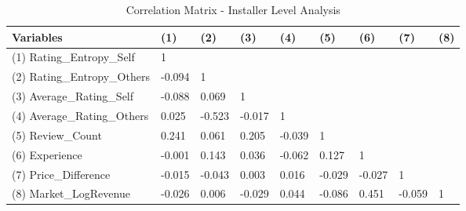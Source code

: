 \begin{table}[H]
\centering
\begin{tabular}{@{}lllllllll@{}}
\toprule
Variables                   & (1)    & (2)    & (3)    & (4)    & (5)    & (6)    & (7)        & (8)     \\ \midrule
(1) Rating\_Entropy\_Self   & 1      & \multicolumn{7}{l}{}                                              \\
(2) Rating\_Entropy\_Others & -0.094 & 1      & \multicolumn{6}{l}{}                                     \\
(3) Average\_Rating\_Self   & -0.088 & 0.069  & 1      & \multicolumn{5}{l}{}                            \\
(4) Average\_Rating\_Others & 0.025  & -0.523 & -0.017 & 1      & \multicolumn{4}{l}{}                   \\
(5) Review\_Count           & 0.241  & 0.061  & 0.205  & -0.039 & 1      & \multicolumn{3}{l}{}          \\
(6) Experience              & -0.001 & 0.143  & 0.036  & -0.062 & 0.127  & 1      & \multicolumn{2}{l}{} \\
(7) Price\_Difference       & -0.015 & -0.043 & 0.003  & 0.016  & -0.029 & -0.027 & 1          &         \\
(8) Market\_LogRevenue      & -0.026 & 0.006  & -0.029 & 0.044  & -0.086 & 0.451  & -0.059     & 1       \\ \bottomrule
\end{tabular}%
\caption{Correlation Matrix - Installer Level Analysis}
\label{corr_ind}
\end{table} 